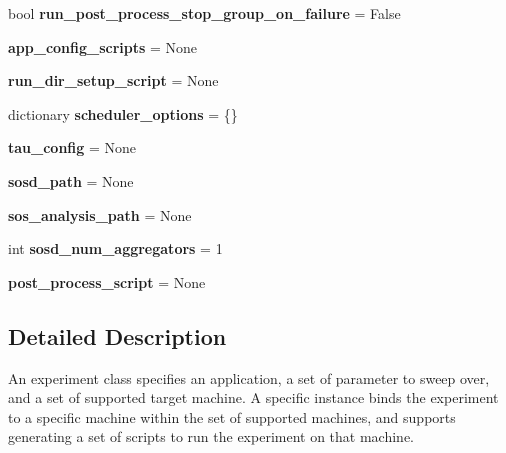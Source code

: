 \begin{DoxyCompactItemize}
bool {\bfseries run\+\_\+post\+\_\+process\+\_\+stop\+\_\+group\+\_\+on\+\_\+failure} = False
\item 
\mbox{\label{classcodar_1_1cheetah_1_1model_1_1_campaign_a434f06408e6b364e0efc232fa107eb33}} 
{\bfseries app\+\_\+config\+\_\+scripts} = None
\item 
\mbox{\label{classcodar_1_1cheetah_1_1model_1_1_campaign_aa7d421cedfa8ffb615f6fd8f38b208ef}} 
{\bfseries run\+\_\+dir\+\_\+setup\+\_\+script} = None
\item 
\mbox{\label{classcodar_1_1cheetah_1_1model_1_1_campaign_a6c58ab5dac64e6ab4796c6e6de6347c7}} 
dictionary {\bfseries scheduler\+\_\+options} = \{\}
\item 
\mbox{\label{classcodar_1_1cheetah_1_1model_1_1_campaign_a28e44a6ede93e17d40627bd9a31fa8d3}} 
{\bfseries tau\+\_\+config} = None
\item 
\mbox{\label{classcodar_1_1cheetah_1_1model_1_1_campaign_af655e512e1d8b7a3bd5104d890dab023}} 
{\bfseries sosd\+\_\+path} = None
\item 
\mbox{\label{classcodar_1_1cheetah_1_1model_1_1_campaign_a521eea7dac8df14f3ea9174cd6297340}} 
{\bfseries sos\+\_\+analysis\+\_\+path} = None
\item 
\mbox{\label{classcodar_1_1cheetah_1_1model_1_1_campaign_a8cdebf43b605e4ac036fbf4e0b9e7d15}} 
int {\bfseries sosd\+\_\+num\+\_\+aggregators} = 1
\item 
\mbox{\label{classcodar_1_1cheetah_1_1model_1_1_campaign_a7452ae0f9b6946a5e531cf6bebd55179}} 
{\bfseries post\+\_\+process\+\_\+script} = None
\end{DoxyCompactItemize}


\subsection{Detailed Description}
\begin{DoxyVerb}An experiment class specifies an application, a set of parameter to
sweep over, and a set of supported target machine. A specific instance
binds the experiment to a specific machine within the set of supported
machines, and supports generating a set of scripts to run the experiment
on that machine.\end{DoxyVerb}
 

